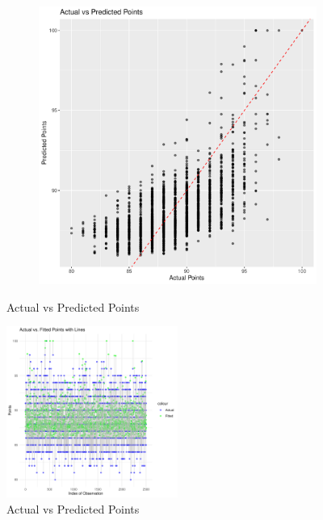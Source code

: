 \documentclass{article}
\begin{document}
\begin{figure}[htbp]
\begin{subfigure}{0.32\textwidth}
	\end{subfigure}\hfill
	\begin{subfigure}{0.32\textwidth}
		\includegraphics[width=\textwidth]{imgs/Rplots-26.pdf}
	\end{subfigure}
	
	\caption{Actual vs Predicted Points}
	\label{fig:a_v_p}
\end{figure}

\begin{figure}[htbp]
	\centering
	\includegraphics[width=0.5\textwidth]{imgs/Rplots-25.pdf}
	\caption{Actual vs Predicted Points}
	\label{fig:a_v_p_2}
\end{figure}
\end{document}
